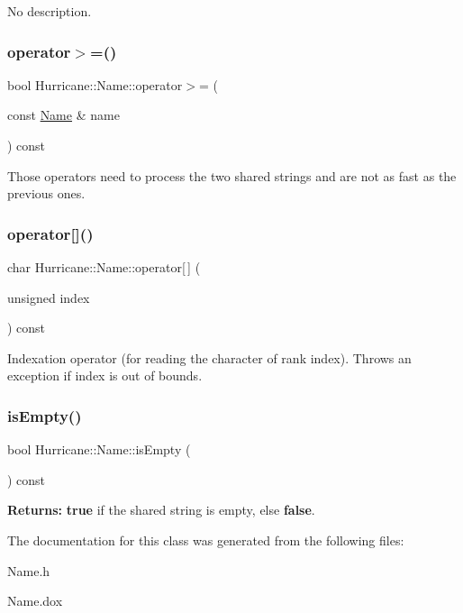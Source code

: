 No description. \mbox{\label{classHurricane_1_1Name_a241d0568f16c8ba60d4c5148be6a48b3}} 
\subsubsection{\texorpdfstring{operator$>$=()}{operator>=()}}
{\footnotesize\ttfamily bool Hurricane\+::\+Name\+::operator$>$= (\begin{DoxyParamCaption}\item[{const \mbox{\hyperlink{classHurricane_1_1Name}{Name}} \&}]{name }\end{DoxyParamCaption}) const}

Those operators need to process the two shared strings and are not as fast as the previous ones. \mbox{\label{classHurricane_1_1Name_a2e6f3869321016de8f98f2b35f136ab4}} 
\subsubsection{\texorpdfstring{operator[]()}{operator[]()}}
{\footnotesize\ttfamily char Hurricane\+::\+Name\+::operator\mbox{[}$\,$\mbox{]} (\begin{DoxyParamCaption}\item[{unsigned}]{index }\end{DoxyParamCaption}) const}

Indexation operator (for reading the character of rank index). Throws an exception if index is out of bounds. \mbox{\label{classHurricane_1_1Name_a6c05cf200a0aeb95f98603fa0c9c9d4b}} 
\subsubsection{\texorpdfstring{is\+Empty()}{isEmpty()}}
{\footnotesize\ttfamily bool Hurricane\+::\+Name\+::is\+Empty (\begin{DoxyParamCaption}{ }\end{DoxyParamCaption}) const}

{\bfseries Returns\+:} {\bfseries true} if the shared string is empty, else {\bfseries false}. 

The documentation for this class was generated from the following files\+:\begin{DoxyCompactItemize}
\item 
Name.\+h\item 
Name.\+dox\end{DoxyCompactItemize}

